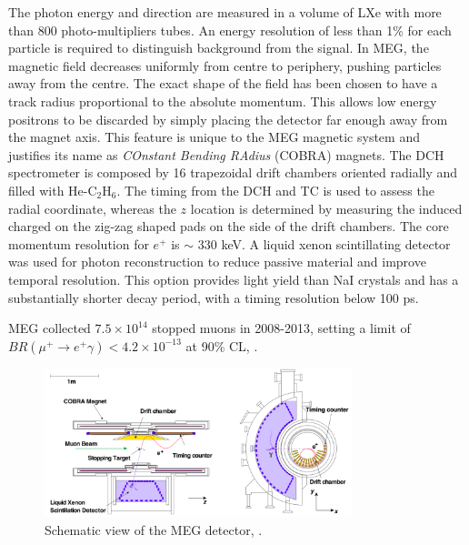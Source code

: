 The photon energy and direction are measured in a volume of LXe with more than 800 photo-multipliers tubes. 
An energy resolution of less than 1\% for each particle is required to distinguish background from the signal. 
In MEG, the magnetic field decreases uniformly from centre to periphery, pushing particles away from the centre. 
The exact shape of the field has been chosen to have a track radius proportional to the absolute momentum.
This allows low energy positrons to be discarded by simply placing the detector far enough away from the magnet axis. 
This feature is unique to the MEG magnetic system and justifies its name as \textit{COnstant Bending RAdius} (COBRA) magnets.
The DCH spectrometer is composed by 16 trapezoidal drift chambers oriented radially and filled with He-C$_2$H$_6$. 
The timing from the DCH and TC is used to assess the radial coordinate, whereas the $z$ location is determined by measuring the induced
charged on the zig-zag shaped pads on the side of the drift chambers. The core momentum resolution for $e^+$ is $\sim$ 330 keV.
A liquid xenon scintillating detector was used for photon reconstruction to reduce passive material and improve temporal resolution. 
This option provides  light yield than NaI crystals 
and has a substantially shorter decay period, with a timing resolution below 100 ps.

MEG collected $7.5 \times 10^{14}$ stopped muons in 2008-2013, 
setting a limit of $BR(\mu^+ \rightarrow e^+ \gamma) < 4.2 \times 10^{-13}$ at 90\% CL, \cite{megi}.
\begin{figure}[!h]
\centering
\includegraphics[width =0.8\textwidth]{figures/png/Screenshot_20240321_115127.png}
\caption[MEG detector.]{Schematic view of the MEG detector, \cite{megi}.}
\label{fig:meg}
\end{figure}
